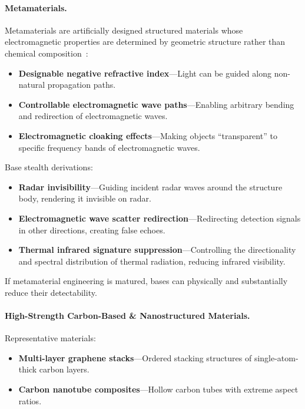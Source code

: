 \documentclass[aps,prd,twocolumn,superscriptaddress,nofootinbib]{revtex4-2}
\begin{document}
\paragraph{Metamaterials.}

Metamaterials are artificially designed structured materials whose electromagnetic properties are determined by geometric structure rather than chemical composition~\cite{Pendry2006}:

\begin{itemize}
  \item \textbf{Designable negative refractive index}---Light can be guided along non-natural propagation paths.
  \item \textbf{Controllable electromagnetic wave paths}---Enabling arbitrary bending and redirection of electromagnetic waves.
  \item \textbf{Electromagnetic cloaking effects}---Making objects ``transparent'' to specific frequency bands of electromagnetic waves.
\end{itemize}

Base stealth derivations:

\begin{itemize}
  \item \textbf{Radar invisibility}---Guiding incident radar waves around the structure body, rendering it invisible on radar.
  \item \textbf{Electromagnetic wave scatter redirection}---Redirecting detection signals in other directions, creating false echoes.
  \item \textbf{Thermal infrared signature suppression}---Controlling the directionality and spectral distribution of thermal radiation, reducing infrared visibility.
\end{itemize}

If metamaterial engineering is matured, bases can physically and substantially reduce their detectability.

\paragraph{High-Strength Carbon-Based \& Nanostructured Materials.}

Representative materials:

\begin{itemize}
  \item \textbf{Multi-layer graphene stacks}---Ordered stacking structures of single-atom-thick carbon layers.
  \item \textbf{Carbon nanotube composites}---Hollow carbon tubes with extreme aspect ratios.
\end{itemize}
\end{document}
